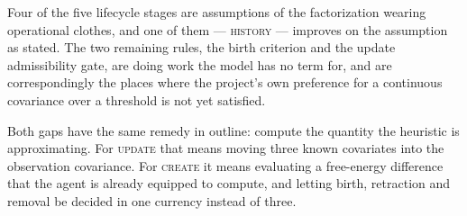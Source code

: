 \documentclass[11pt,a4paper]{report}
\begin{document}
Four of the five lifecycle stages are assumptions of the factorization wearing operational
clothes, and one of them --- \textsc{history} --- improves on the assumption as stated. The two
remaining rules, the birth criterion and the update admissibility gate, are doing work the model
has no term for, and are correspondingly the places where the project's own preference for a
continuous covariance over a threshold is not yet satisfied.

Both gaps have the same remedy in outline: compute the quantity the heuristic is approximating.
For \textsc{update} that means moving three known covariates into the observation covariance. For
\textsc{create} it means evaluating a free-energy difference that the agent is already equipped to
compute, and letting birth, retraction and removal be decided in one currency instead of three.
\end{document}
